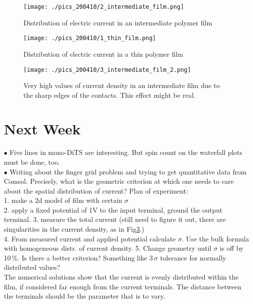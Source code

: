 \documentclass[12pt,a4paper]{report}
\begin{document}
\begin{figure} [!ht]
\begin{center}
       \texttt{[image: ./pics\_200410/2\_intermediate\_film.png]}
       \end{center}
\caption{Distribution of electric current in an intermediate polymer film}
     \label{fig:dits_inter}
\end{figure}

\begin{figure} [!ht]
\begin{center}
       \texttt{[image: ./pics\_200410/1\_thin\_film.png]}
       \end{center}
\caption{Distribution of electric current in a thin polymer film}
     \label{fig:dits_thin}
\end{figure}

\begin{figure} [!ht]
\begin{center}
       \texttt{[image: ./pics\_200410/3\_intermediate\_film\_2.png]}
       \end{center}
\caption{Very high values of current density in an intermediate film due to the sharp edges of the contacts. This effect might be real.}
     \label{fig:dits_singular}
\end{figure}


\newpage
\section{Next Week}
\paragraph{}
$\bullet$ Five lines in mono-DiTS are interesting. But spin count on the waterfall plots must be done, too.\\
$\bullet$ Writing about the finger grid problem and trying to get quantitative data from Comsol. Precisely, what is the geometric criterion at which one needs to care about the spatial distribution of current? Plan of experiment:\\
1. make a 2d model of film with certain $\sigma$\\
2. apply a fixed potential of 1V to the input terminal, ground the output terminal.
3. measure the total current (still need to figure it out, there are singularities in the current density, as in Fig\ref{fig:dits_singular}.)\\
4. From measured current and applied potential calculate $\sigma$. Use the bulk formula with homogeneous distr. of current density.
5. Change geometry until $\sigma$ is off by 10$\,\%$. Is there a better criterion? Something like 3$\,\sigma$ tolerance for normally distributed values?\\
The numerical solutions show that the current is evenly distributed within the film, if considered far enough from the current terminals. The distance between the terminals should be the parameter that is to vary.
\end{document}
